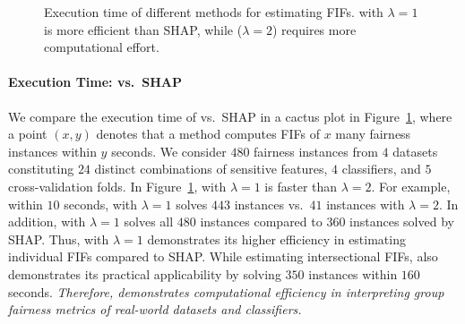 \begin{figure}
	\centering
	\caption[Execution time of FIFs in $ \mathsf{SP} $]{Execution time of different methods for estimating FIFs. {\fairXplainer} with $ \lambda = 1 $ is more efficient than SHAP, while {\fairXplainer} ($ \lambda = 2 $) requires more computational effort.
	}
	\label{fairness_fairXplainer_fig:execution_time_cactus_plot}
\end{figure}



\paragraph{Execution Time: {\fairXplainer} vs.\ SHAP} We compare the execution time of {\fairXplainer} vs.\ SHAP in a cactus plot in Figure~\ref{fairness_fairXplainer_fig:execution_time_cactus_plot}, where a point $ (x, y) $ denotes that a method computes FIFs of $ x $ many fairness instances within $ y $ seconds. We consider $ 480 $ fairness instances from $ 4 $ datasets constituting $ 24 $ distinct combinations of sensitive features, $ 4 $ classifiers, and $ 5 $ cross-validation folds. In Figure~\ref{fairness_fairXplainer_fig:execution_time_cactus_plot},  {\fairXplainer} with $ \lambda = 1 $ is faster than  $ \lambda = 2 $. For example, within $ 10 $ seconds, {\fairXplainer} with $ \lambda = 1 $ solves $ 443 $ instances vs.\ $ 41 $ instances with $ \lambda = 2 $.  In addition, {\fairXplainer} with $ \lambda = 1 $ solves all $ 480 $ instances compared to $ 360 $ instances solved by SHAP. Thus, {\fairXplainer} with $ \lambda = 1 $ demonstrates its higher efficiency in estimating individual FIFs compared to SHAP. While estimating intersectional FIFs, {\fairXplainer} also demonstrates its practical applicability by solving $ 350 $ instances within  $ 160 $ seconds. \textit{Therefore, {\fairXplainer} demonstrates computational efficiency in interpreting group fairness metrics of real-world datasets and classifiers.}


